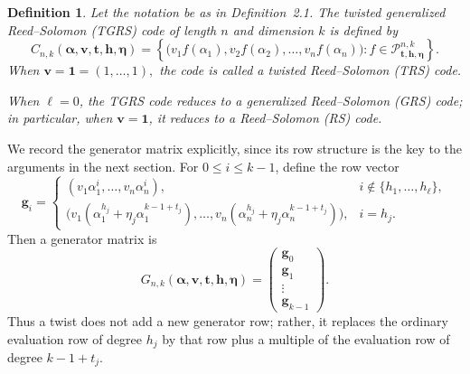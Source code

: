 \documentclass[12pt,draftcls,journal,onecolumn]{IEEEtran}
\newtheorem{definition}[theorem]{Definition}
\newcommand{\F}{{\mathbb{F}}}
\begin{document}

\begin{definition}
Let the notation be as in Definition~2.1. The twisted generalized
Reed--Solomon (TGRS) code of length \(n\) and dimension \(k\) is defined by
\[
C_{n,k}(\boldsymbol{\alpha},\mathbf{v},
\boldsymbol{t},\mathbf{h},\boldsymbol{\eta})
=
\left\{
\bigl(
v_1f(\alpha_1),v_2f(\alpha_2),\ldots,v_nf(\alpha_n)
\bigr)
:
f\in
\mathcal{P}_{\boldsymbol{t},\mathbf{h},\boldsymbol{\eta}}^{n,k}
\right\}.
\]
When
\(
\mathbf{v}=\mathbf{1}=(1,\ldots,1),
\)
the code is called a twisted Reed--Solomon (TRS) code.

When \(\ell=0\), the TGRS code reduces to a generalized
Reed--Solomon (GRS) code; in particular, when
\(\mathbf{v}=\mathbf{1}\), it reduces to a Reed--Solomon (RS) code.
\end{definition}

We record the generator matrix explicitly, since its row structure is the key to the arguments in the next section. For $0\le i\le k-1$, define the row vector
\[
\boldsymbol{g}_i=
\begin{cases}
(v_1\alpha_1^i,\ldots,v_n\alpha_n^i),
& i\notin\{h_1,\ldots,h_\ell\},\\[1mm]
\bigl(v_1(\alpha_1^{h_j}+\eta_j\alpha_1^{k-1+t_j}),\ldots,
      v_n(\alpha_n^{h_j}+\eta_j\alpha_n^{k-1+t_j})\bigr),
& i=h_j.
\end{cases}
\]
Then a generator matrix is
\begin{equation}\label{eqggg}
G_{n,k}(\boldsymbol{\alpha},\boldsymbol{v},
\boldsymbol{t},\boldsymbol{h},\boldsymbol{\eta})
=
\begin{pmatrix}
\boldsymbol{g}_0\\
\boldsymbol{g}_1\\
\vdots\\
\boldsymbol{g}_{k-1}
\end{pmatrix}.
\end{equation}
Thus a twist does not add a new generator row; rather, it replaces the ordinary evaluation row of degree $h_j$ by that row plus a multiple of the evaluation row of degree $k-1+t_j$.
\end{document}
